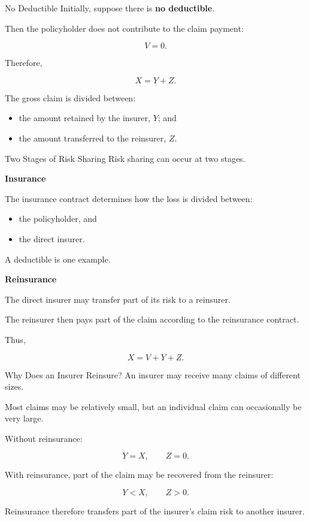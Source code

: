 \documentclass[
  ignorenonframetext,
  aspectratio=169,
]{beamer}
\providecommand{\tightlist}{%
  \setlength{\itemsep}{0pt}\setlength{\parskip}{0pt}}
\begin{document}
\begin{frame}{No Deductible}
\protect{}\label{no-deductible}
Initially, suppose there is \textbf{no deductible}.

Then the policyholder does not contribute to the claim payment:

\[
V=0.
\]

Therefore,

\[
\boxed{X=Y+Z}.
\]

The gross claim is divided between:

\begin{itemize}
\tightlist
\item
  the amount retained by the insurer, \(Y\); and
\item
  the amount transferred to the reinsurer, \(Z\).
\end{itemize}
\end{frame}

\begin{frame}{Two Stages of Risk Sharing}
\protect{}\label{two-stages-of-risk-sharing}
Risk sharing can occur at two stages.

\textbf{Insurance}

The insurance contract determines how the loss is divided between:

\begin{itemize}
\tightlist
\item
  the policyholder, and
\item
  the direct insurer.
\end{itemize}

A deductible is one example.

\textbf{Reinsurance}

The direct insurer may transfer part of its risk to a reinsurer.

The reinsurer then pays part of the claim according to the reinsurance
contract.

Thus,

\[
\boxed{X=V+Y+Z}.
\]
\end{frame}

\begin{frame}{Why Does an Insurer Reinsure?}
\protect{}\label{why-does-an-insurer-reinsure}
An insurer may receive many claims of different sizes.

Most claims may be relatively small, but an individual claim can
occasionally be very large.

Without reinsurance:

\[
Y=X,
\qquad
Z=0.
\]

With reinsurance, part of the claim may be recovered from the reinsurer:

\[
Y<X,
\qquad
Z>0.
\]

Reinsurance therefore transfers part of the insurer's claim risk to
another insurer.
\end{frame}
\end{document}
